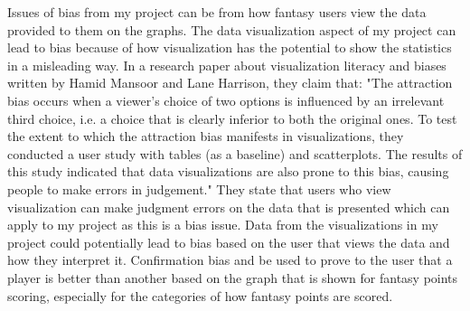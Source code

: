 \documentclass[10pt,twocolumn]{article}
\begin{document}
Issues of bias from my project can be from how fantasy users view the data provided to them on the graphs. The data visualization aspect of my project can lead to bias because of how visualization has the potential to show the statistics in a misleading way. In a research paper about visualization literacy and biases written by Hamid Mansoor and Lane Harrison, they claim that: "The attraction bias occurs when a viewer’s choice of two options is influenced by an irrelevant third choice, i.e. a choice that is clearly inferior to both the original ones. To test the extent to which the attraction bias manifests in visualizations, they conducted a user study with tables (as a baseline) and scatterplots. The results of this study indicated that data visualizations are also prone to this bias, causing people to make errors in judgement."\cite{visualizationBias} They state that users who view visualization can make judgment errors on the data that is presented which can apply to my project as this is a bias issue. Data from the visualizations in my project could potentially lead to bias based on the user that views the data and how they interpret it. Confirmation bias and be used to prove to the user that a player is better than another based on the graph that is shown for fantasy points scoring, especially for the categories of how fantasy points are scored.




\printbibliography 
\end{document}
